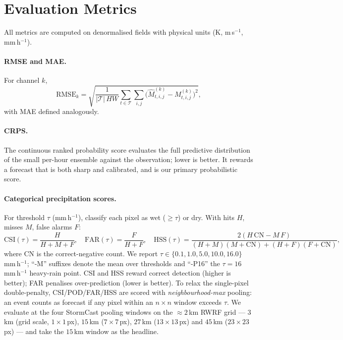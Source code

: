 \section{Evaluation Metrics}
\label{sec:exp-metrics}

All metrics are computed on denormalised fields with physical units (K, m\,s$^{-1}$, mm\,h$^{-1}$).

\paragraph{RMSE and MAE.} For channel $k$,
\begin{equation}
  \mathrm{RMSE}_k = \sqrt{\frac{1}{|\mathcal{T}|\,HW}\sum_{t \in \mathcal{T}}\sum_{i,j}\bigl(\hat{M}^{(k)}_{t,i,j} - M^{(k)}_{t,i,j}\bigr)^2},
\end{equation}
with MAE defined analogously.

\paragraph{CRPS.} The continuous ranked probability score evaluates the full predictive distribution of the small per-hour ensemble against the observation; lower is better. It rewards a forecast that is both sharp and calibrated, and is our primary probabilistic score.

\paragraph{Categorical precipitation scores.} For threshold $\tau$ (mm\,h$^{-1}$), classify each pixel as wet ($\geq \tau$) or dry. With hits $H$, misses $M$, false alarms $F$:
\begin{equation}
  \mathrm{CSI}(\tau) = \frac{H}{H + M + F}, \quad
  \mathrm{FAR}(\tau) = \frac{F}{H + F}, \quad
  \mathrm{HSS}(\tau) = \frac{2(H\,\mathrm{CN} - M\,F)}{(H+M)(M+\mathrm{CN}) + (H+F)(F+\mathrm{CN})},
\end{equation}
where $\mathrm{CN}$ is the correct-negative count. We report $\tau \in \{0.1, 1.0, 5.0, 10.0, 16.0\}$\,mm\,h$^{-1}$; ``-M'' suffixes denote the mean over thresholds and ``-P16'' the $\tau = 16$\,mm\,h$^{-1}$ heavy-rain point. CSI and HSS reward correct detection (higher is better); FAR penalises over-prediction (lower is better). To relax the single-pixel double-penalty, CSI/POD/FAR/HSS are scored with \emph{neighbourhood-max} pooling: an event counts as forecast if any pixel within an $n \times n$ window exceeds $\tau$. We evaluate at the four StormCast pooling windows \citep{pathak2024stormcast} on the $\approx 2$\,km RWRF grid --- $3$\,km (grid scale, $1\times1$\,px), $15$\,km ($7\times7$\,px), $27$\,km ($13\times13$\,px) and $45$\,km ($23\times23$\,px) --- and take the $15$\,km window as the headline.

